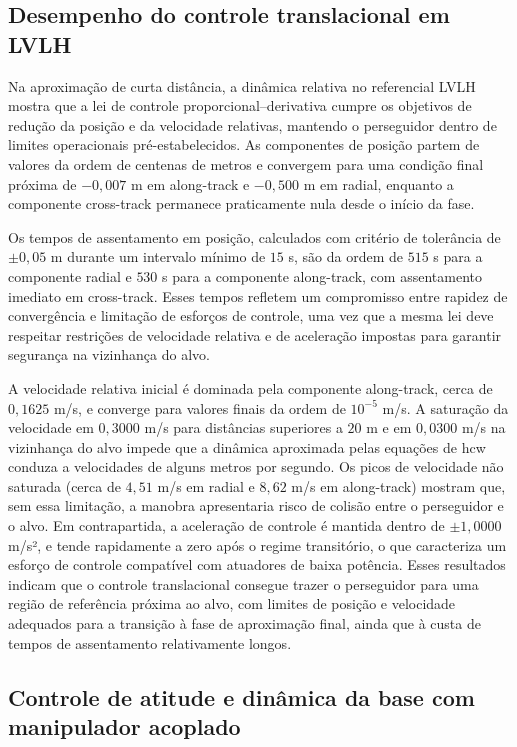 \subsection{Desempenho do controle translacional em LVLH}

Na aproximação de curta distância, a dinâmica relativa no referencial LVLH mostra que a lei de controle proporcional--derivativa cumpre os objetivos de redução da posição e da velocidade relativas, mantendo o perseguidor dentro de limites operacionais pré-estabelecidos. As componentes de posição partem de valores da ordem de centenas de metros e convergem para uma condição final próxima de $-0{,}007$ m em along-track e $-0{,}500$ m em radial, enquanto a componente cross-track permanece praticamente nula desde o início da fase.

Os tempos de assentamento em posição, calculados com critério de tolerância de $\pm 0{,}05$ m durante um intervalo mínimo de $15$ s, são da ordem de $515$ s para a componente radial e $530$ s para a componente along-track, com assentamento imediato em cross-track. Esses tempos refletem um compromisso entre rapidez de convergência e limitação de esforços de controle, uma vez que a mesma lei deve respeitar restrições de velocidade relativa e de aceleração impostas para garantir segurança na vizinhança do alvo.

A velocidade relativa inicial é dominada pela componente along-track, cerca de $0{,}1625$ m/s, e converge para valores finais da ordem de $10^{-5}$ m/s. A saturação da velocidade em $0{,}3000$ m/s para distâncias superiores a $20$ m e em $0{,}0300$ m/s na vizinhança do alvo impede que a dinâmica aproximada pelas equações de \gls{hcw} conduza a velocidades de alguns metros por segundo. Os picos de velocidade não saturada (cerca de $4{,}51$ m/s em radial e $8{,}62$ m/s em along-track) mostram que, sem essa limitação, a manobra apresentaria risco de colisão entre o perseguidor e o alvo. Em contrapartida, a aceleração de controle é mantida dentro de $\pm 1{,}0000$ m/s², e tende rapidamente a zero após o regime transitório, o que caracteriza um esforço de controle compatível com atuadores de baixa potência.
Esses resultados indicam que o controle translacional consegue trazer o perseguidor para uma região de referência próxima ao alvo, com limites de posição e velocidade adequados para a transição à fase de aproximação final, ainda que à custa de tempos de assentamento relativamente longos.

\subsection{Controle de atitude e dinâmica da base com manipulador acoplado}

